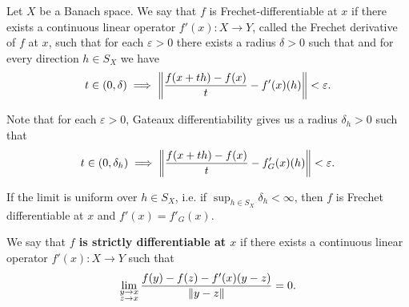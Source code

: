 \begin{definition}
\begin{defenum}
    \cite[definition 1.12]{Phelps1993} Let \( X \) be a Banach space. We say that \( f \) is Frechet-differentiable at \( x \) if there exists a continuous linear operator \( f'(x): X \to Y \), called the Frechet derivative of \( f \) at \( x \), such that for each \( \varepsilon > 0 \) there exists a radius \( \delta > 0 \) such that and for every direction \( h \in S_X \) we have
    \begin{equation*}
      t \in (0, \delta) \implies \left\Vert  \frac {f(x + th) - f(x)} t - f'(x)(h) \right\Vert < \varepsilon.
    \end{equation*}

    Note that for each \( \varepsilon > 0 \), Gateaux differentiability gives us a radius \( \delta_h > 0 \) such that
    \begin{equation*}
      t \in (0, \delta_h) \implies \left\Vert  \frac {f(x + th) - f(x)} t - f_G'(x)(h) \right\Vert < \varepsilon.
    \end{equation*}

    If the limit is uniform over \( h \in S_X \), i.e. if \( \sup_{h \in S_X} \delta_h < \infty \), then \( f \) is Frechet differentiable at \( x \) and \( f'(x) = f'_G(x) \).

    \cite[33]{Dontchev2014} We say that \textbf{\( f \) is strictly differentiable at \( x \)} if there exists a continuous linear operator \( f'(x): X \to Y \) such that
    \begin{equation*}
      \lim_{\substack{y \to x \\ z \to x}} \frac{f(y) - f(z) - f'(x)(y - z)} {\left\Vert y - z \right\Vert} = 0.
    \end{equation*}
  \end{defenum}
\end{definition}

